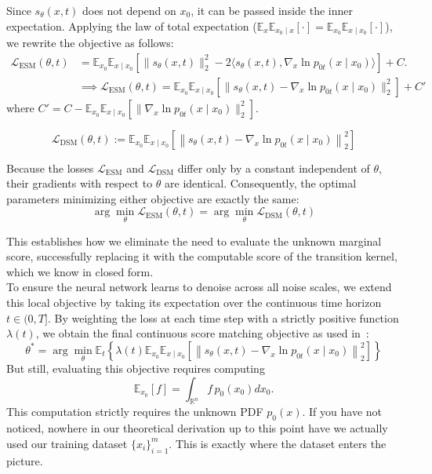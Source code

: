 \documentclass[11pt]{amsart}
\theoremstyle{plain}
\theoremstyle{definition}
\theoremstyle{remark}
\numberwithin{equation}{section}
\begin{document}
{Since $s_\theta(x, t)$ does not depend on $x_0$, it can be passed inside the inner expectation. Applying the law of total expectation ($\mathbb{E}_x \mathbb{E}_{x_0 \mid x}[\cdot] = \mathbb{E}_{x_0} \mathbb{E}_{x \mid x_0}[\cdot]$), we rewrite the objective as follows:
\begin{align*}
\mathcal{L}_{\text{ESM}}(\theta, t) &= \mathbb{E}_{x_0} \mathbb{E}_{x \mid x_0} \left[ \| s_\theta(x, t) \|_2^2 - 2 \langle s_\theta(x, t), \nabla_x \ln p_{0t}(x \mid x_0) \rangle \right] + C.\\
&\implies \mathcal{L}_{\text{ESM}}(\theta, t) = \mathbb{E}_{x_0} \mathbb{E}_{x \mid x_0} \left[ \| s_\theta(x, t) - \nabla_x \ln p_{0t}(x \mid x_0) \|_2^2 \right] + C' 
\end{align*}
where $C' = C - \mathbb{E}_{x_0} \mathbb{E}_{x \mid x_0} \left[ \| \nabla_x \ln p_{0t}(x \mid x_0) \|_2^2 \right]$.

$$ \mathcal{L}_{\text{DSM}}(\theta, t) := \mathbb{E}_{x_0} \mathbb{E}_{x \mid x_0} \left[ \left\| s_\theta(x, t) - \nabla_x \ln p_{0t}(x \mid x_0) \right\|_2^2 \right] $$

Because the losses $\mathcal{L}_{\text{ESM}}$ and $\mathcal{L}_{\text{DSM}}$ differ only by a constant independent of $\theta$, their gradients with respect to $\theta$ are identical. Consequently, the optimal parameters minimizing either objective are exactly the same:
$$ \arg\min_\theta \mathcal{L}_{\text{ESM}}(\theta, t) = \arg\min_\theta \mathcal{L}_{\text{DSM}}(\theta, t) $$

This establishes how we eliminate the need to evaluate the unknown marginal score, successfully replacing it with the computable score of the transition kernel, which we know in closed form.\\

To ensure the neural network learns to denoise across all noise scales, we extend this local objective by taking its expectation over the continuous time horizon $t \in (0, T]$. By weighting the loss at each time step with a strictly positive function $\lambda(t)$, we obtain the final continuous score matching objective as used in~\cite{song2020}:
\begin{equation} 
    \theta^* = \arg \min_\theta \mathbb{E}_t \left\{ \lambda(t) \mathbb{E}_{x_0} \mathbb{E}_{x \mid x_0} \left[ \left\| s_\theta(x, t) - \nabla_x \ln p_{0t}(x \mid x_0) \right\|_2^2 \right] \right\} 
    \label{score-obj}
\end{equation}
But still, evaluating this objective requires computing
$$ \mathbb{E}_{x_0}[f] = \int_{\mathbb{R}^n} f \, p_0(x_0) dx_0. $$
This computation strictly requires the unknown PDF $p_0(x)$. If you have not noticed, nowhere in our theoretical derivation up to this point have we actually used our training dataset $\{x_i\}_{i=1}^m$. This is exactly where the dataset enters the picture.\\

}
\end{document}

